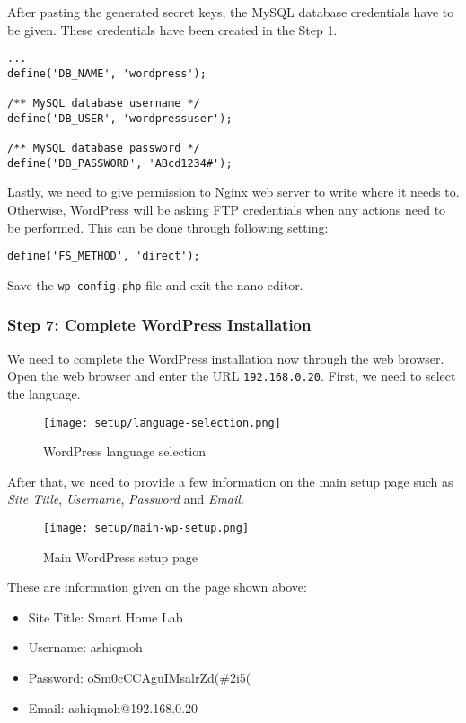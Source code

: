 After pasting the generated secret keys, the MySQL database credentials have to be given. These credentials have been created in the Step 1.
\begin{lstlisting}
...
define('DB_NAME', 'wordpress');

/** MySQL database username */
define('DB_USER', 'wordpressuser');

/** MySQL database password */
define('DB_PASSWORD', 'ABcd1234#');
\end{lstlisting}

Lastly, we need to give permission to Nginx web server to write where it needs to. Otherwise, WordPress will be asking FTP credentials when any actions need to be performed. This can be done through following setting:
\begin{lstlisting}
define('FS_METHOD', 'direct');
\end{lstlisting}

Save the \texttt{wp-config.php} file and exit the nano editor.

\subsubsection*{Step 7: Complete WordPress Installation}
We need to complete the WordPress installation now through the web browser. Open the web browser and enter the URL \texttt{192.168.0.20}. First, we need to select the language.

\begin{figure}[h]
\caption{WordPress language selection}
\label{fig:wordpress-language-selection}
\centering
\texttt{[image: setup/language-selection.png]}
\end{figure}

After that, we need to provide a few information on the main setup page such as \emph{Site Title}, \emph{Username}, \emph{Password} and \emph{Email}.

\begin{figure}[h]
\caption{Main WordPress setup page}
\centering
\texttt{[image: setup/main-wp-setup.png]}
\end{figure}

These are information given on the page shown above:
\begin{itemize}
\item Site Title: Smart Home Lab
\item Username: ashiqmoh
\item Password: oSm0cCCAguIMsalrZd(\#2i5(
\item Email: ashiqmoh@192.168.0.20
\end{itemize}

